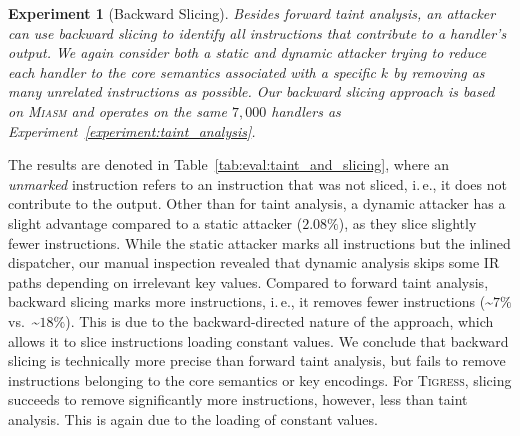\documentclass[letterpaper,twocolumn,10pt]{article}
\newcommand{\ie}{i.\,e.,\xspace}
\newcommand{\ex}[1]{Experiment~\ref{#1}}
\theoremstyle{customexample}
\theoremstyle{customexperiment}
\newtheorem{experiment}{Experiment}
\newcommand{\tigress}{\textsc{Tigress}\xspace}
\newcommand{\miasm}{\textsc{Miasm}\xspace}
\begin{document}
\begin{experiment}[Backward Slicing]
Besides forward taint analysis, an attacker can use backward slicing to identify all instructions that contribute to a handler's output. We again consider both a static and dynamic attacker trying to reduce each handler to the core semantics associated with a specific $k$ by removing as many unrelated instructions as possible. Our backward slicing approach is based on \miasm and operates on the same $7,000$ handlers as \ex{experiment:taint_analysis}. \end{experiment}
The results are denoted in Table~\ref{tab:eval:taint_and_slicing}, where an \emph{unmarked} instruction refers to an instruction that was not sliced, \ie it does not contribute to the output.
Other than for taint analysis, a dynamic attacker has a slight advantage compared to a static attacker ($2.08\%$), as they slice slightly fewer instructions. 
While the static attacker marks all instructions but the inlined dispatcher, our manual inspection revealed that dynamic analysis skips some IR paths depending on irrelevant key values.
Compared to forward taint analysis, backward slicing marks more instructions, \ie it removes fewer instructions (\textasciitilde$7\%$ vs.\ \textasciitilde$18\%$). This is due to the backward-directed nature of the approach, which allows it to slice instructions loading constant values. We conclude that backward slicing is technically more precise than forward taint analysis, but fails to remove instructions belonging to the core semantics or key encodings. For \tigress, slicing succeeds to remove significantly more instructions, however, less than taint analysis. This is again due to the loading of constant values.
\end{document}
